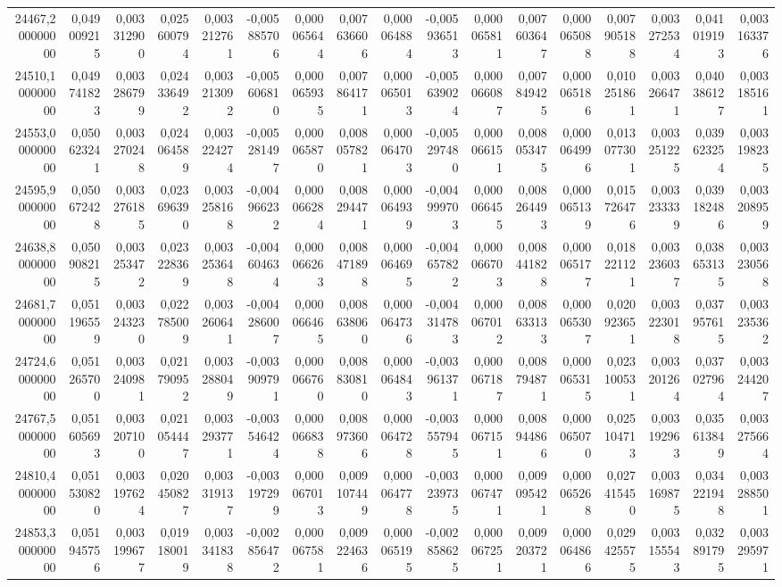 \begin{longtable}{rrrrrrrrrrrrrrrrr}
24467,200000000 & 0,049009215 & 0,003312900 & 0,025600794 & 0,003212761 & -0,005885706 & 0,000065644 & 0,007636606 & 0,000064884 & -0,005936513 & 0,000065811 & 0,007603647 & 0,000065088 & 0,007905188 & 0,003272534 & 0,041019193 & 0,003163376\\
24510,100000000 & 0,049741823 & 0,003286799 & 0,024336492 & 0,003213092 & -0,005606810 & 0,000065935 & 0,007864171 & 0,000065013 & -0,005639024 & 0,000066087 & 0,007849425 & 0,000065186 & 0,010251861 & 0,003266471 & 0,040386127 & 0,003185161\\
24553,000000000 & 0,050623241 & 0,003270248 & 0,024064589 & 0,003224274 & -0,005281497 & 0,000065870 & 0,008057821 & 0,000064703 & -0,005297480 & 0,000066151 & 0,008053475 & 0,000064996 & 0,013077301 & 0,003251225 & 0,039623254 & 0,003198235\\
24595,900000000 & 0,050672428 & 0,003276185 & 0,023696390 & 0,003258168 & -0,004966232 & 0,000066284 & 0,008294471 & 0,000064939 & -0,004999703 & 0,000066455 & 0,008264493 & 0,000065139 & 0,015726476 & 0,003233339 & 0,039182486 & 0,003208959\\
24638,800000000 & 0,050908215 & 0,003253472 & 0,023228369 & 0,003253648 & -0,004604634 & 0,000066263 & 0,008471898 & 0,000064695 & -0,004657822 & 0,000066703 & 0,008441828 & 0,000065177 & 0,018221121 & 0,003236037 & 0,038653135 & 0,003230568\\
24681,700000000 & 0,051196559 & 0,003243230 & 0,022785009 & 0,003260641 & -0,004286007 & 0,000066465 & 0,008638060 & 0,000064736 & -0,004314783 & 0,000067012 & 0,008633133 & 0,000065307 & 0,020923651 & 0,003223018 & 0,037957615 & 0,003235362\\
24724,600000000 & 0,051265700 & 0,003240981 & 0,021790952 & 0,003288049 & -0,003909791 & 0,000066760 & 0,008830810 & 0,000064843 & -0,003961371 & 0,000067187 & 0,008794871 & 0,000065315 & 0,023100531 & 0,003201264 & 0,037027964 & 0,003244207\\
24767,500000000 & 0,051605693 & 0,003207100 & 0,021054447 & 0,003293771 & -0,003546424 & 0,000066838 & 0,008973606 & 0,000064728 & -0,003557945 & 0,000067151 & 0,008944866 & 0,000065070 & 0,025104713 & 0,003192963 & 0,035613849 & 0,003275664\\
24810,400000000 & 0,051530820 & 0,003197624 & 0,020450827 & 0,003319137 & -0,003197299 & 0,000067013 & 0,009107449 & 0,000064778 & -0,003239735 & 0,000067471 & 0,009095421 & 0,000065268 & 0,027415450 & 0,003169875 & 0,034221948 & 0,003288501\\
24853,300000000 & 0,051945756 & 0,003199677 & 0,019180019 & 0,003341838 & -0,002856472 & 0,000067581 & 0,009224636 & 0,000065195 & -0,002858625 & 0,000067251 & 0,009203721 & 0,000064866 & 0,029425575 & 0,003155543 & 0,032891795 & 0,003295971\\

\end{longtable}
